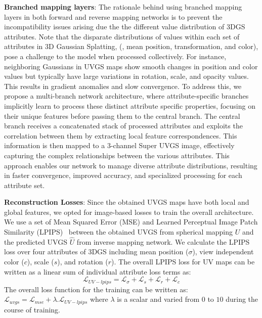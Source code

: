 \noindent\textbf{Branched mapping layers}: 
The rationale behind using branched mapping layers in both forward and reverse mapping networks is to prevent the incompatibility issues arising due the the different value distribution of 3DGS attributes. 
Note that the disparate distributions of values within each set of attributes in 3D Gaussian Splatting, (\ie, mean position, transformation, and color), pose a challenge to the model when processed collectively. 
For instance, neighboring Gaussians in UVGS maps show smooth changes in position and color values but typically have large variations in rotation, scale, and opacity values. This results in gradient anomalies and slow convergence.
To address this, we propose a multi-branch network architecture, where attribute-specific branches implicitly learn to process these distinct attribute specific properties, focusing on their unique features before passing them to the central branch. The central branch receives a concatenated stack of processed attributes and exploits the correlation between them by extracting local feature correspondences. This information is then mapped to a 3-channel Super UVGS image, effectively capturing the complex relationships between the various attributes.
 This approach enables our network to manage diverse attribute distributions, resulting in faster convergence, improved accuracy, and specialized processing for each attribute set.


\noindent\textbf{Reconstruction Losses}:
Since the obtained UVGS maps have both local and global features, we opted for image-based losses to train the overall architecture. 
We use a set of Mean Squared Error (MSE) and Learned Perceptual Image Patch Similarity (LPIPS)~\cite{zhang2018perceptual}  between the obtained UVGS from spherical mapping $U$ and the predicted UVGS $\hat{U}$ from inverse mapping network. 
We calculate the LPIPS loss over four attributes of 3DGS including mean position ($\sigma$), view independent color ($c$), scale ($s$), and rotation ($r$). 
The overall LPIPS loss for UV maps can be written as a linear sum of individual attribute loss terms as: 
\begin{equation}
    \mathcal{L}_{UV-lpips} =\mathcal{L}_{\sigma} + \mathcal{L}_{s} + \mathcal{L}_{r} + \mathcal{L}_{c}
\end{equation}
The overall loss function for the training can be written as: \(\mathcal{L}_{uvgs} = \mathcal{L}_{mse} + \lambda . \mathcal{L}_{UV-lpips}\) where $\lambda$ is a scalar and varied from $0$ to $10$ during the course of training.



